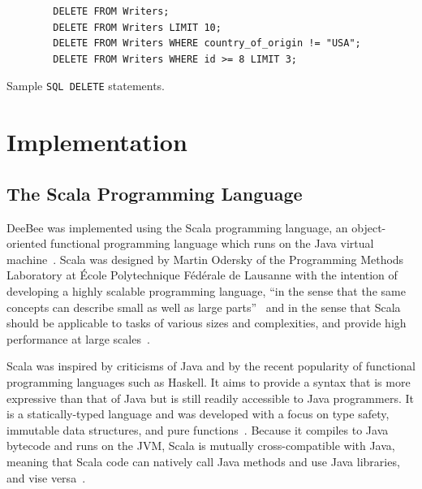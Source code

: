 \begin{listing}[h]
    \begin{verbatim}
        DELETE FROM Writers;
        DELETE FROM Writers LIMIT 10;
        DELETE FROM Writers WHERE country_of_origin != "USA";
        DELETE FROM Writers WHERE id >= 8 LIMIT 3; 
    \end{verbatim}
    \caption{Sample \texttt{SQL DELETE} statements.}
    \label{lst:delete}
\end{listing}

\FloatBarrier

\section{Implementation}

\subsection{The Scala Programming Language}

DeeBee was implemented using the Scala programming language, an object-oriented functional programming language which runs on the Java virtual machine~\cite{odersky2004scala,odersky2004overview,odersky2008programming}. Scala was designed by Martin Odersky of the Programming Methods Laboratory at \'Ecole Polytechnique F\'ed\'erale de Lausanne with the intention of developing a highly scalable programming language, ``in the sense that the same concepts can describe small as well as large parts''~\cite{odersky2004scala} and in the sense that Scala should be applicable to tasks of various sizes and complexities, and provide high performance at large scales~\cite{odersky2008programming}. 

Scala was inspired by criticisms of Java and by the recent popularity of functional programming languages such as Haskell. It aims to provide a syntax that is more expressive than that of Java but is still readily accessible to Java programmers. It is a statically-typed language and was developed with a focus on type safety, immutable data structures, and pure functions~\cite{odersky2004scala,odersky2004overview,odersky2008programming}. Because it compiles to Java bytecode and runs on the JVM, Scala is mutually cross-compatible with Java, meaning that Scala code can natively call Java methods and use Java libraries, and vise versa~\cite{odersky2008programming}.

